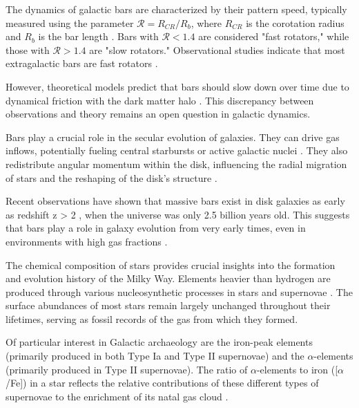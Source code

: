 The dynamics of galactic bars are characterized by their pattern speed, typically measured using the parameter $\mathcal{R} = R_{CR}/R_b$, where $R_{CR}$ is the corotation radius and $R_b$ is the bar length \citep{2000ApJ...543..704D}. Bars with $\mathcal{R} < 1.4$ are considered "fast rotators," while those with $\mathcal{R} > 1.4$ are "slow rotators." Observational studies indicate that most extragalactic bars are fast rotators \citep{2011MSAIS..18...23C, 2015AA...576A.102A, 2019MNRAS.482.1733G, 2020MNRAS.491.3655G}.

However, theoretical models predict that bars should slow down over time due to dynamical friction with the dark matter halo \citep{1981AA....96..164C, 1992ApJ...400...80H, 2000ApJ...543..704D}. This discrepancy between observations and theory remains an open question in galactic dynamics.

Bars play a crucial role in the secular evolution of galaxies. They can drive gas inflows, potentially fueling central starbursts or active galactic nuclei \citep{1989Natur.338...45S, 1990Natur.345..679S}. They also redistribute angular momentum within the disk, influencing the radial migration of stars and the reshaping of the disk's structure \citep{2002MNRAS.336..785A, 2011A&A...527A.147M}.

Recent observations have shown that massive bars exist in disk galaxies as early as redshift z > 2 \citep{2022arXiv221008658G}, when the universe was only 2.5 billion years old. This suggests that bars play a role in galaxy evolution from very early times, even in environments with high gas fractions \citep{2020ARAA..58..157T}.


The chemical composition of stars provides crucial insights into the formation and evolution history of the Milky Way. Elements heavier than hydrogen are produced through various nucleosynthetic processes in stars and supernovae \citep{2023A&ARv..31....1A}. The surface abundances of most stars remain largely unchanged throughout their lifetimes, serving as fossil records of the gas from which they formed.

Of particular interest in Galactic archaeology are the iron-peak elements (primarily produced in both Type Ia and Type II supernovae) and the $\alpha$-elements (primarily produced in Type II supernovae). The ratio of $\alpha$-elements to iron ([$\alpha$/Fe]) in a star reflects the relative contributions of these different types of supernovae to the enrichment of its natal gas cloud \citep{1979ApJ...229.1046T, 1986A&A...154..279M}.

